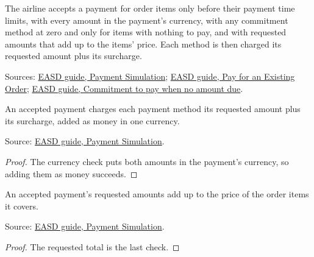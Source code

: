 \begin{definition}
  \label{def:payment-accept}
  The airline accepts a payment for order items only before their payment
  time limits, with every amount in the payment's currency, with any
  commitment method at zero and only for items with nothing to pay, and with
  requested amounts that add up to the items' price.  Each method is then
  charged its requested amount plus its surcharge.

  Sources: \href{https://standards.atlassian.net/wiki/spaces/EASD/pages/2593030164/Payment+Simulation}{EASD guide, Payment Simulation};
  \href{https://standards.atlassian.net/wiki/spaces/EASD/pages/574226556/Pay+for+an+Existing+Order}{EASD guide, Pay for an Existing Order};
  \href{https://standards.atlassian.net/wiki/spaces/EASD/pages/2593488900/Commitment+to+pay+when+no+amount+due}{EASD guide, Commitment to pay when no amount due}.
\end{definition}

\begin{theorem}
  \label{thm:payment-accept-charges}
  An accepted payment charges each payment method its requested amount plus
  its surcharge, added as money in one currency.

  Source: \href{https://standards.atlassian.net/wiki/spaces/EASD/pages/2593030164/Payment+Simulation}{EASD guide, Payment Simulation}.
\end{theorem}
\begin{proof}
  The currency check puts both amounts in the payment's currency, so adding
  them as money succeeds.
\end{proof}

\begin{theorem}
  \label{thm:payment-accept-requested}
  An accepted payment's requested amounts add up to the price of the order
  items it covers.

  Source: \href{https://standards.atlassian.net/wiki/spaces/EASD/pages/2593030164/Payment+Simulation}{EASD guide, Payment Simulation}.
\end{theorem}
\begin{proof}
  The requested total is the last check.
\end{proof}

